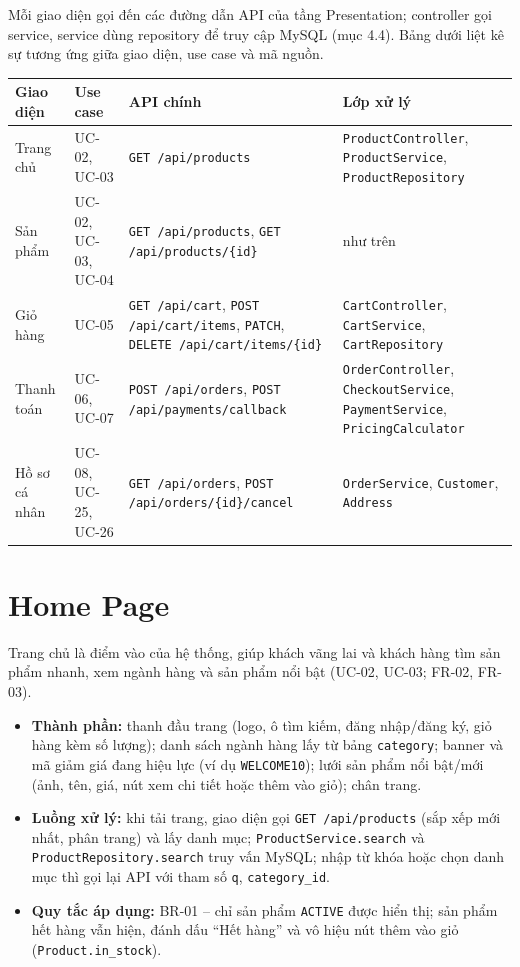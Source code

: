 \documentclass[12pt,a4paper,oneside]{report}
\begin{document}
Mỗi giao diện gọi đến các đường dẫn API của tầng Presentation; controller gọi service, service dùng repository để truy cập MySQL (mục 4.4). Bảng dưới liệt kê sự tương ứng giữa giao diện, use case và mã nguồn.

\begin{longtable}{@{}>{\raggedright\arraybackslash}p{2.8cm}>{\raggedright\arraybackslash}p{2.6cm}>{\raggedright\arraybackslash}p{4.6cm}>{\raggedright\arraybackslash}p{5.2cm}@{}}
\toprule
\textbf{Giao diện} & \textbf{Use case} & \textbf{API chính} & \textbf{Lớp xử lý} \\
\midrule
\endhead
Trang chủ & UC-02, UC-03 & \texttt{GET /api/products} & \texttt{ProductController}, \texttt{ProductService}, \texttt{ProductRepository} \\
Sản phẩm & UC-02, UC-03, UC-04 & \texttt{GET /api/products}, \texttt{GET /api/products/\{id\}} & như trên \\
Giỏ hàng & UC-05 & \texttt{GET /api/cart}, \texttt{POST /api/cart/items}, \texttt{PATCH}, \texttt{DELETE /api/cart/items/\{id\}} & \texttt{CartController}, \texttt{CartService}, \texttt{CartRepository} \\
Thanh toán & UC-06, UC-07 & \texttt{POST /api/orders}, \texttt{POST /api/payments/callback} & \texttt{OrderController}, \texttt{CheckoutService}, \texttt{PaymentService}, \texttt{PricingCalculator} \\
Hồ sơ cá nhân & UC-08, UC-25, UC-26 & \texttt{GET /api/orders}, \texttt{POST /api/orders/\{id\}/cancel} & \texttt{OrderService}, \texttt{Customer}, \texttt{Address} \\
\bottomrule
\end{longtable}

\section{Home Page}

Trang chủ là điểm vào của hệ thống, giúp khách vãng lai và khách hàng tìm sản phẩm nhanh, xem ngành hàng và sản phẩm nổi bật (UC-02, UC-03; FR-02, FR-03).

\begin{itemize}
  \item \textbf{Thành phần:} thanh đầu trang (logo, ô tìm kiếm, đăng nhập/đăng ký, giỏ hàng kèm số lượng); danh sách ngành hàng lấy từ bảng \texttt{category}; banner và mã giảm giá đang hiệu lực (ví dụ \texttt{WELCOME10}); lưới sản phẩm nổi bật/mới (ảnh, tên, giá, nút xem chi tiết hoặc thêm vào giỏ); chân trang.
  \item \textbf{Luồng xử lý:} khi tải trang, giao diện gọi \texttt{GET /api/products} (sắp xếp mới nhất, phân trang) và lấy danh mục; \texttt{ProductService.search} và \texttt{ProductRepository.search} truy vấn MySQL; nhập từ khóa hoặc chọn danh mục thì gọi lại API với tham số \texttt{q}, \texttt{category\_id}.
  \item \textbf{Quy tắc áp dụng:} BR-01 -- chỉ sản phẩm \texttt{ACTIVE} được hiển thị; sản phẩm hết hàng vẫn hiện, đánh dấu ``Hết hàng'' và vô hiệu nút thêm vào giỏ (\texttt{Product.in\_stock}).
\end{itemize}
\end{document}

